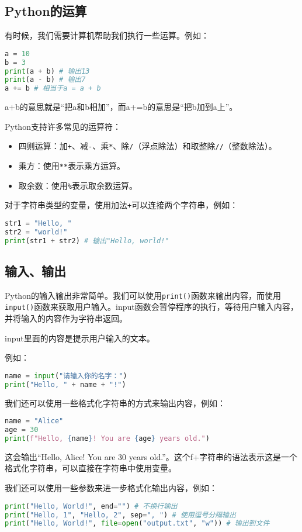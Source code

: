 \documentclass[../main.tex]{subfiles}
\begin{document}
\subsection{Python的运算}

有时候，我们需要计算机帮助我们执行一些运算。例如：
\begin{lstlisting}[language=python]
a = 10
b = 3
print(a + b) # 输出13
print(a - b) # 输出7
a += b # 相当于a = a + b
\end{lstlisting}
a+b的意思就是“把a和b相加”，而a+=b的意思是“把b加到a上”。

Python支持许多常见的运算符：
\begin{itemize}
    \item 四则运算：加\texttt{+}、减\texttt{-}、乘\texttt{*}、除\texttt{/}（浮点除法）和取整除\texttt{//}（整数除法）。
    \item 乘方：使用\texttt{**}表示乘方运算。
    \item 取余数：使用\texttt{\%}表示取余数运算。
\end{itemize}

对于字符串类型的变量，使用加法\texttt{+}可以连接两个字符串，例如：
\begin{lstlisting}[language=python]
str1 = "Hello, "
str2 = "world!"
print(str1 + str2) # 输出"Hello, world!"
\end{lstlisting}

\subsection{输入、输出}
Python的输入输出非常简单。我们可以使用\texttt{print()}函数来输出内容，而使用\texttt{input()}函数来获取用户输入。input函数会暂停程序的执行，等待用户输入内容，并将输入的内容作为字符串返回。

input里面的内容是提示用户输入的文本。

例如：
\begin{lstlisting}[language=python]
name = input("请输入你的名字：")
print("Hello, " + name + "!")
\end{lstlisting}

我们还可以使用一些格式化字符串的方式来输出内容，例如：
\begin{lstlisting}[language=python]
name = "Alice"
age = 30
print(f"Hello, {name}! You are {age} years old.")
\end{lstlisting}
这会输出“Hello, Alice! You are 30 years old.”。这个f+字符串的语法表示这是一个格式化字符串，可以直接在字符串中使用变量。

我们还可以使用一些参数来进一步格式化输出内容，例如：
\begin{lstlisting}[language=python]
print("Hello, World!", end="") # 不换行输出
print("Hello, 1", "Hello, 2", sep=", ") # 使用逗号分隔输出
print("Hello, World!", file=open("output.txt", "w")) # 输出到文件
\end{lstlisting}
\end{document}
